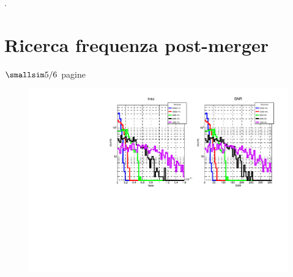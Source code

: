 \lipsum[7]\cite{hartle2003gravity}.

\section{Ricerca frequenza post-merger}
\begin{center}
	$\smallsim 5/6$ pagine
\end{center}

\begin{center}
	\begin{figure}[H]
		\centering
		\includegraphics[scale=0.68, angle=0]{figures/Capitolo_4/hrss_snr_Distribution.pdf}
		\setlength{\belowcaptionskip}{-20pt}
		\caption{}
		\label{fig:hrss_snr_distribution}
	\end{figure}
\end{center}	


\lipsum[8]

\lipsum[9]
